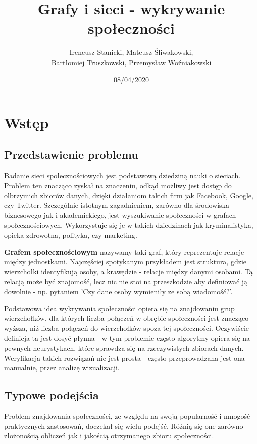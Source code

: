\documentclass{article}
\title{Grafy i sieci - wykrywanie społeczności}
\date{08/04/2020}
\author{Ireneusz Stanicki, Mateusz Śliwakowski,\\Bartłomiej Truszkowski, Przemysław Woźniakowski}
\begin{document}
	\begin{titlingpage}
		\maketitle
	\end{titlingpage}

\tableofcontents
\newpage

\section{Wstęp}
\subsection{Przedstawienie problemu}
Badanie sieci społecznościowych jest podstawową dziedziną nauki o sieciach. Problem ten znacząco zyskał na znaczeniu, odkąd możliwy jest dostęp do olbrzymich zbiorów danych, dzięki działaniom takich firm jak Facebook, Google, czy Twitter. Szczególnie istotnym zagadnieniem, zarówno dla środowiska biznesowego jak i akademickiego, jest wyszukiwanie społeczności w grafach społecznościowych. Wykorzystuje się je w takich dziedzinach jak kryminalistyka, opieka zdrowotna, polityka, czy marketing\cite{ms-paper1}.

\textbf{Grafem społecznościowym} nazywamy taki graf, który reprezentuje relacje między jednostkami. Najczęściej spotykanym przykładem jest struktura, gdzie wierzchołki identyfikują osoby, a krawędzie - relacje między danymi osobami. Tą relacją może być znajomość, lecz nic nie stoi na przeszkodzie aby definiować ją dowolnie - np. pytaniem 'Czy dane osoby wymieniły ze sobą wiadomość?'.

Podstawowa idea wykrywania społeczności opiera się na znajdowaniu grup wierzchołków, dla których liczba połączeń w obrębie społeczności jest znacząco wyższa, niż liczba połączeń do wierzchołków spoza tej społeczności. Oczywiście definicja ta jest dosyć płynna - w tym problemie często algorytmy opiera się na pewnych heurystykach, które sprawdza się na rzeczywistych zbiorach danych. Weryfikacja takich rozwiązań nie jest prosta - często przeprowadzana jest ona manualnie, przez analizę wizualizacji. 

\subsection{Typowe podejścia}
Problem znajdowania społeczności, ze względu na swoją popularność i mnogość praktycznych zastosowań, doczekał się wielu podejść. Różnią się one zarówno złożonością obliczeń jak i jakością otrzymanego zbioru społeczności.
\end{document}

